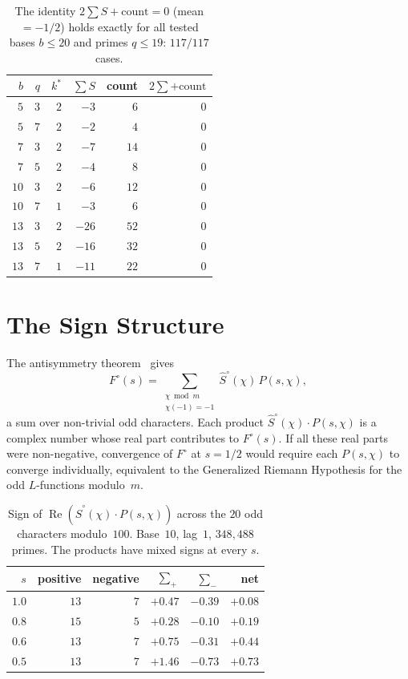 \documentclass[12pt]{amsart}
\theoremstyle{definition}
\theoremstyle{remark}
\begin{document}
\begin{table}[h]
\centering
\begin{tabular}{rrrrrr}
\toprule
$b$ & $q$ & $k^{*}$ & $\sum S$ & count &
$2\sum{+}\text{count}$ \\
\midrule
$5$ & $3$ & $2$ & $-3$ & $6$ & $0$ \\
$5$ & $7$ & $2$ & $-2$ & $4$ & $0$ \\
$7$ & $3$ & $2$ & $-7$ & $14$ & $0$ \\
$7$ & $5$ & $2$ & $-4$ & $8$ & $0$ \\
$10$ & $3$ & $2$ & $-6$ & $12$ & $0$ \\
$10$ & $7$ & $1$ & $-3$ & $6$ & $0$ \\
$13$ & $3$ & $2$ & $-26$ & $52$ & $0$ \\
$13$ & $5$ & $2$ & $-16$ & $32$ & $0$ \\
$13$ & $7$ & $1$ & $-11$ & $22$ & $0$ \\
\bottomrule
\end{tabular}
\caption{The identity $2\sum S + \text{count} = 0$
(mean $= -1/2$) holds exactly for all tested bases
$b \le 20$ and primes $q \le 19$: $117/117$ cases.}
\label{tab:general}
\end{table}

\section{The Sign Structure}

The antisymmetry theorem~\cite{paperB} gives
\[
F^{\circ}(s) = \sum_{\substack{\chi \bmod m \\
\chi(-1) = -1}} \hat{S}^{\circ}(\chi)\, P(s, \chi),
\]
a sum over non-trivial odd characters. Each product
$\hat{S}^{\circ}(\chi) \cdot P(s, \chi)$ is a complex
number whose real part contributes to $F^{\circ}(s)$.
If all these real parts were non-negative, convergence
of $F^{\circ}$ at $s = 1/2$ would require each
$P(s, \chi)$ to converge individually, equivalent to
the Generalized Riemann Hypothesis for the odd
$L$-functions modulo~$m$.

\begin{table}[h]
\centering
\begin{tabular}{rrrrrr}
\toprule
$s$ & positive & negative & $\sum_+ $ & $\sum_-$ &
net \\
\midrule
$1.0$ & $13$ & $7$ & $+0.47$ & $-0.39$ & $+0.08$ \\
$0.8$ & $15$ & $5$ & $+0.28$ & $-0.10$ & $+0.19$ \\
$0.6$ & $13$ & $7$ & $+0.75$ & $-0.31$ & $+0.44$ \\
$0.5$ & $13$ & $7$ & $+1.46$ & $-0.73$ & $+0.73$ \\
\bottomrule
\end{tabular}
\caption{Sign of
$\operatorname{Re}(\hat{S}^{\circ}(\chi) \cdot
P(s, \chi))$ across the $20$ odd characters
modulo~$100$. Base~$10$, lag~$1$, $348{,}488$ primes.
The products have mixed signs at every $s$.}
\label{tab:signs10}
\end{table}
\end{document}
